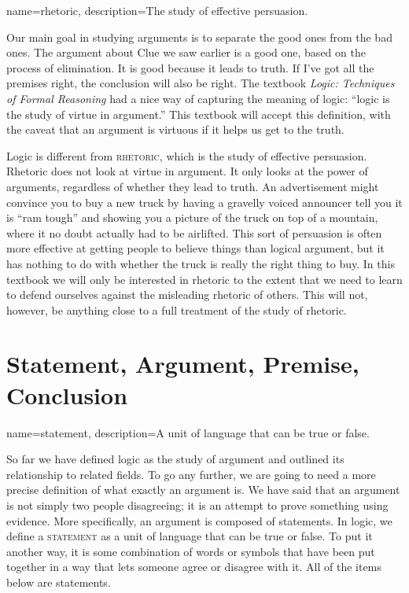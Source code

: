 {
name=rhetoric,
description={The study of effective persuasion.}
}


Our main goal in studying arguments is to separate the good ones from the bad ones. The argument about Clue we saw earlier is a good one, based on the process of elimination.  It is good because it leads to truth. If I've got all the premises right, the conclusion will also be right. The textbook \textit{Logic: Techniques of Formal Reasoning} \citep{Kalish1980} had a nice way of capturing the meaning of logic: ``logic is the study of virtue in argument.'' \label{virtue_in_argument} This textbook will accept this definition, with the caveat that an argument is virtuous if it helps us get to the truth.

Logic is different from \textsc{\gls{rhetoric}}, which is the study of effective persuasion. Rhetoric does not look at virtue in argument. It only looks at the power of arguments, regardless of whether they lead to truth. An advertisement might convince you to buy a new truck by having a gravelly voiced announcer tell you it is ``ram tough'' and showing you a picture of the truck on top of a mountain, where it no doubt actually had to be airlifted. This sort of persuasion is often more effective at getting people to believe things than logical argument, but it has nothing to do with whether the truck is really the right thing to buy. In this textbook we will only be interested in rhetoric to the extent that we need to learn to defend ourselves against the misleading rhetoric of others. This will not, however, be anything close to a full treatment of the study of rhetoric.



\section{Statement, Argument, Premise, Conclusion}
\label{sec:SAPC}

{
name=statement,
description={A unit of language that can be true or false.}
}

So far we have defined logic as the study of argument and outlined its relationship to related fields. To go any further, we are going to need a more precise definition of what exactly an argument is. We have said that an argument is not simply two people disagreeing; it is an attempt to prove something using evidence. More specifically, an argument is composed of statements. In logic, we define a \textsc{\gls{statement}} \label{def:statement} as a unit of language that can be true or false. To put it another way, it is some combination of words or symbols that have been put together in a way that lets someone agree or disagree with it. All of the items below are statements.

